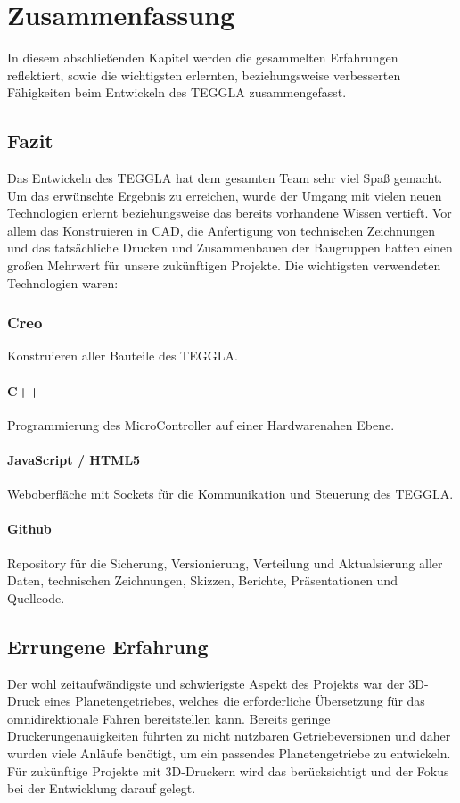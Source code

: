 \chapter{Zusammenfassung}
In diesem abschließenden Kapitel werden die gesammelten Erfahrungen reflektiert, sowie die wichtigsten erlernten, beziehungsweise verbesserten Fähigkeiten beim Entwickeln des TEGGLA zusammengefasst.


\section{Fazit}
Das Entwickeln des TEGGLA hat dem gesamten Team sehr viel Spaß gemacht.
Um das erwünschte Ergebnis zu erreichen, wurde der Umgang mit vielen neuen Technologien erlernt beziehungsweise das bereits vorhandene Wissen vertieft. 
Vor allem das Konstruieren in CAD, die Anfertigung von technischen Zeichnungen und das tatsächliche Drucken und Zusammenbauen der Baugruppen hatten einen großen Mehrwert für unsere zukünftigen Projekte. 
Die wichtigsten verwendeten Technologien waren:

\subsection*{Creo}
Konstruieren aller Bauteile des TEGGLA.

\subsubsection*{C++}
Programmierung des MicroController auf einer Hardwarenahen Ebene.

\subsubsection*{JavaScript / HTML5}
Weboberfläche mit Sockets für die Kommunikation und Steuerung des TEGGLA.

\subsubsection*{Github}
Repository für die Sicherung, Versionierung, Verteilung und Aktualsierung aller Daten, technischen Zeichnungen, Skizzen, Berichte, Präsentationen und Quellcode.


\section{Errungene Erfahrung}
Der wohl zeitaufwändigste und schwierigste Aspekt des Projekts war der 3D-Druck eines Planetengetriebes, welches die erforderliche Übersetzung für das omnidirektionale Fahren bereitstellen kann. Bereits geringe Druckerungenauigkeiten führten zu nicht nutzbaren Getriebeversionen und daher wurden viele Anläufe benötigt, um ein passendes Planetengetriebe zu entwickeln. Für zukünftige Projekte mit 3D-Druckern wird das berücksichtigt und der Fokus bei der Entwicklung darauf gelegt.  

